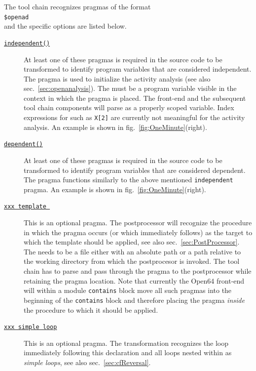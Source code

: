 \documentclass{book}
\newcommand{\refsec}[1]{{sec.~\ref{#1}}}
\newcommand{\reffig}[1]{{fig.~\ref{#1}}}
\begin{document}
The tool chain recognizes pragmas of the format\\[1ex]
\hspace*{.3cm}\lstinline{$openad }{\tt\em <pragma argument>}\\[1ex] %
and the specific {\tt\em <pragma argument>} options are listed below.  
\begin{description} 
\item[\underline{\tt independent({\em <variable name>})}] 
At least one of these pragmas is required in the source 
code to be transformed to identify program variables that are considered independent. 
The pragma is used to initialize the activity analysis (see also \refsec{sec:openanalysis}).
The {\em <variable name>} must be a program variable visible in the context in which the pragma is placed.
The front-end and the subsequent tool chain components will parse {\em <variable name>} as a properly 
scoped variable. Index expressions for {\em <variable name>} such as \lstinline{X[2]} are currently not meaningful
for the activity analysis. 
An example is shown in \reffig{fig:OneMinute}(right).
\item[\underline{\tt dependent({\em <variable name>})}] 
At least one of these pragmas is required in the source 
code to be transformed to identify program variables that are considered dependent.
The pragma functions similarly to the above mentioned \lstinline{independent} pragma. 
An example is shown in \reffig{fig:OneMinute}(right).
\item[\underline{\tt xxx template {\em <template file>}}] 
This is an optional pragma.
The postprocessor will recognize 
the procedure in which the pragma occurs (or which immediately follows) as the target to which 
the template should be applied, see also \refsec{sec:PostProcessor}.
The {\em <template file>} needs to be a file either with an absolute path or a 
path relative to the working directory from which the postprocesor is invoked. 
The tool chain has to  parse and pass through the pragma to the postprocessor while retaining the pragma location.
Note that currently the Open64 front-end will within a module \lstinline{contains} block move all such pragmas into the 
beginning of the \lstinline{contains} block and therefore placing the pragma {\em inside} the procedure 
to which it should be applied.
\item[\underline{\tt xxx simple loop}]
This is an optional pragma. 
The transformation recognizes the loop immediately following this declaration and all 
loops nested within as {\em simple loops}, see also \refsec{sec:cfReversal}.
\end{description}
\end{document}
